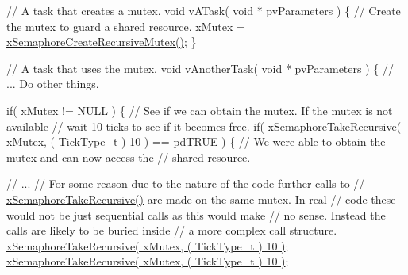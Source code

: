 \begin{DoxyPre}// A task that creates a mutex.
void vATask( void * pvParameters )
\{
 // Create the mutex to guard a shared resource.
 xMutex = \hyperlink{vendor_2ceedling_2plugins_2freertos_2src_2freertos_2include_2semphr_8h_a1bbc843be5a41ea83d2693b2189fc0f8}{xSemaphoreCreateRecursiveMutex()};
\}\end{DoxyPre}



\begin{DoxyPre}// A task that uses the mutex.
void vAnotherTask( void * pvParameters )
\{
 // ... Do other things.\end{DoxyPre}



\begin{DoxyPre} if( xMutex != NULL )
 \{
     // See if we can obtain the mutex.  If the mutex is not available
     // wait 10 ticks to see if it becomes free.
     if( \hyperlink{vendor_2ceedling_2plugins_2freertos_2src_2freertos_2include_2semphr_8h_ad395f4bba51eea6af3397d72bc079e4d}{xSemaphoreTakeRecursive( xMutex, ( TickType\_t ) 10 )} == pdTRUE )
     \{
         // We were able to obtain the mutex and can now access the
         // shared resource.\end{DoxyPre}



\begin{DoxyPre}         // ...
         // For some reason due to the nature of the code further calls to
         // \hyperlink{vendor_2ceedling_2plugins_2freertos_2src_2freertos_2include_2semphr_8h_ad395f4bba51eea6af3397d72bc079e4d}{xSemaphoreTakeRecursive()} are made on the same mutex.  In real
         // code these would not be just sequential calls as this would make
         // no sense.  Instead the calls are likely to be buried inside
         // a more complex call structure.
         \hyperlink{vendor_2ceedling_2plugins_2freertos_2src_2freertos_2include_2semphr_8h_ad395f4bba51eea6af3397d72bc079e4d}{xSemaphoreTakeRecursive( xMutex, ( TickType\_t ) 10 )};
         \hyperlink{vendor_2ceedling_2plugins_2freertos_2src_2freertos_2include_2semphr_8h_ad395f4bba51eea6af3397d72bc079e4d}{xSemaphoreTakeRecursive( xMutex, ( TickType\_t ) 10 )};\end{DoxyPre}



